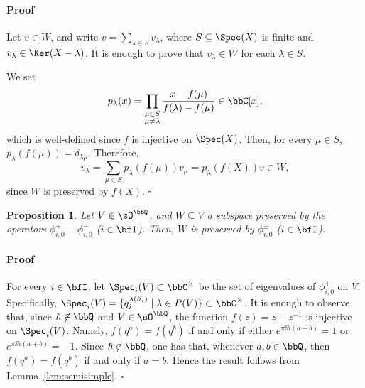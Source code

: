 \documentclass[reqno]{amsart}
\numberwithin{equation}{section}
\newtheorem*{proposition}{Proposition}
\newenvironment{pf}{\medskip\paragraph{{\sc Proof}}}{\hfill$\square$\par\medskip}
\begin{document}
\begin{pf}
Let $v\in W$, and write $v=\sum_{\lambda\in S}v_\lambda$, where
$S\subseteq\Spec(X)$ is finite and $v_\lambda\in\Ker(X-\lambda)$.
It is enough to prove that $v_\lambda\in W$ for each $\lambda\in S$.

We set
\[
p_\lambda(x)=
\prod_{\substack{\mu\in S\\ \mu\neq\lambda}}
\frac{x-f(\mu)}{f(\lambda)-f(\mu)}\in\bbC[x],
\]
which is well-defined since $f$ is injective on $\Spec(X)$.
Then, for every $\mu\in S$, $p_\lambda(f(\mu))=\delta_{\lambda\mu}$.
Therefore,
\[
v_\lambda=\sum_{\mu\in S} p_\lambda(f(\mu))v_\mu=p_\lambda(f(X))v\in W,
\]
since $W$ is preserved by $f(X)$.
\end{pf}

\begin{proposition}\label{prop:cat-O-rational}
Let $V\in\sO^\bbQ$, and $W\subseteq V$ a subspace preserved by the operators $\phi^+_{i,0}-\phi^-_{i,0}$ ($i\in\bfI$). Then, $W$ is preserved by $\phi^\pm_{i,0}$ ($i\in\bfI$).
\end{proposition}

\begin{pf}
For every $i\in\bfI$, let $\Spec_i(V)\subset\bbC^\times$ be the set of eigenvalues of $\phi^+_{i,0}$ on $V$. Specifically, $\Spec_i(V)=\{q_i^{\lambda(h_i)}\mid \lambda\in P(V)\}\subset \bbC^\times$.
It is enough to observe that, since $\hbar\not\in\bbQ$ and $V\in\sO^\bbQ$, the function $f(z)=z-z^{-1}$ is injective on $\Spec_i(V)$. Namely, $f(q^a)=f(q^b)$ if and only if either $e^{\pi\ii\hbar(a-b)}=1$ or $e^{\pi\ii\hbar(a+b)}=-1$. Since $\hbar\not\in\bbQ$, one has that, whenever $a,b\in\bbQ$, then $f(q^a)=f(q^b)$ if and only if $a=b$. Hence the result follows from Lemma~\ref{lem:semisimple}. 
\end{pf}
\end{document}
